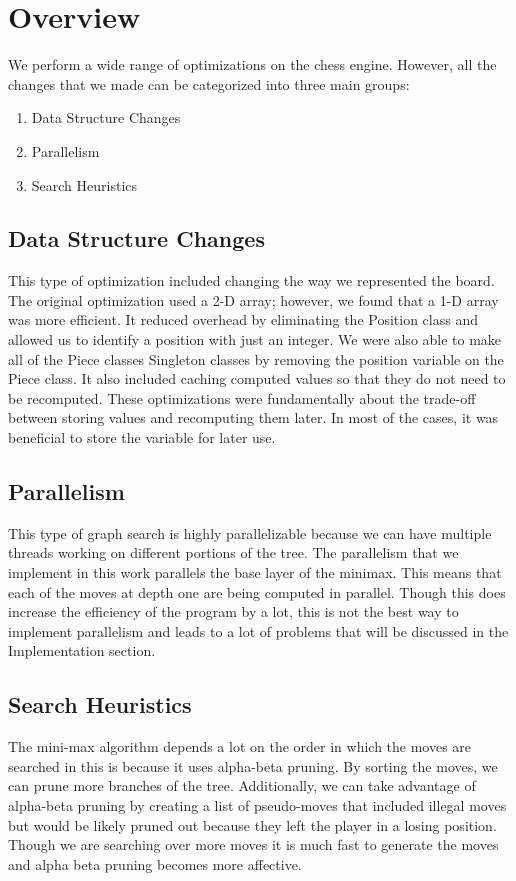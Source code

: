 \documentclass[sigconf]{acmart}
\begin{document}
\section{Overview}
We perform a wide range of optimizations on the chess engine.
However, all the changes that we made can be categorized into three main groups:
\begin{enumerate}
    \item Data Structure Changes
    \item Parallelism
    \item Search Heuristics
\end{enumerate}

\subsection{Data Structure Changes}
This type of optimization included changing the way we represented the board.
The original optimization used a 2-D array; however, we found that a 1-D array was more efficient.
It reduced overhead by eliminating the Position class and allowed us to identify a position with just an integer.
We were also able to make all of the Piece classes Singleton classes by removing the position variable on the Piece class.
It also included caching computed values so that they do not need to be recomputed.
These optimizations were fundamentally about the trade-off between storing values and recomputing them later. 
In most of the cases, it was beneficial to store the variable for later use.

\subsection{Parallelism}
This type of graph search is highly parallelizable because we can have multiple threads working on different portions of the tree.
The parallelism that we implement in this work parallels the base layer of the minimax.
This means that each of the moves at depth one are being computed in parallel.
Though this does increase the efficiency of the program by a lot, this is not the best way to implement parallelism and leads to a lot of problems that will be discussed in the Implementation section.

\subsection{Search Heuristics}
The mini-max algorithm depends a lot on the order in which the moves are searched in this is because it uses alpha-beta pruning.
By sorting the moves, we can prune more branches of the tree.
Additionally, we can take advantage of alpha-beta pruning by creating a list of pseudo-moves that included illegal moves but would be likely pruned out because they left the player in a losing position.
Though we are searching over more moves it is much fast to generate the moves and alpha beta pruning becomes more affective.
\end{document}

